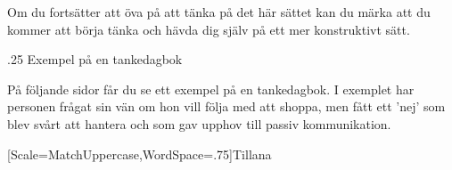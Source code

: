 \documentclass[swedish,a4paper]{book}
\makeatletter
\renewcommand\subsection{\@startsection{subsection}{1}{\z@}%
                                   {\baselineskip}%
                                   {.25\baselineskip}%
                                   {\fontsize{1\baselineskip}{1.25\baselineskip}\selectfont\sffamily\bfseries}} %
\makeatother
\begin{document}
Om du fortsätter att öva på att tänka på det här sättet kan du märka att du kommer att börja tänka och hävda dig själv på ett mer konstruktivt sätt.

\subsection{Exempel på en tankedagbok}\label{tankedagbok}

På följande sidor får du se ett exempel på en tankedagbok. I exemplet har personen frågat sin vän om hon vill följa med att shoppa, men fått ett 'nej' som blev svårt att hantera och som gav upphov till passiv kommunikation.

\setlength\tabcolsep{0pt}
\newcommand\xxx[1]{%
  \begin{minipage}[c][4.25\baselineskip][c]{.3\textwidth}%
  \raggedleft\strut #1\strut%
  \end{minipage}%
}
\newcommand\xy[2]{%
  \begin{minipage}[c][4.25\baselineskip][c]{#1}%
  \raggedleft\strut #2\strut%
  \end{minipage}%
}
\newcommand\xyh[2]{%
  \begin{minipage}[c][3.25\baselineskip][c]{#1}%
  \raggedleft\strut #2\strut%
  \end{minipage}%
}
\newfontfamily{\handwriting}[Scale=MatchUppercase,WordSpace={.75}]{Tillana}
\newcommand\yyy[1]{%
  \hspace{\baselineskip}\begin{minipage}[c][4.25\baselineskip][c]{.7\textwidth-\baselineskip}%
  \handwriting\raggedright\strut\Large #1\strut%
  \end{minipage}%
}
\end{document}
